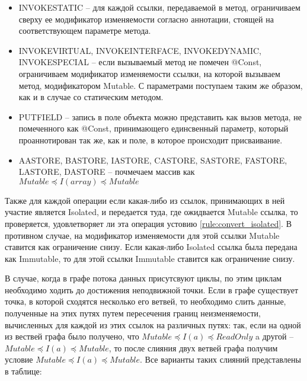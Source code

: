 \begin{itemize}
	\item INVOKESTATIC -- для каждой ссылки, передаваемой в метод, ограничиваем сверху ее модификатор изменяемости согласно аннотации, стоящей на соответствующем параметре метода.  
	\item INVOKEVIRTUAL, INVOKEINTERFACE, INVOKEDYNAMIC, INVOKESPECIAL -- если вызываемый метод не помечен @Const, ограничиваем модификатор изменяемости ссылки, на которой вызываем метод, модификатором Mutable. С параметрами поступаем таким же образом, как и в случае со статическим методом. 
	\item PUTFIELD -- запись в поле объекта можно представить как вызов метода, не помеченного как @Const, принимающего единсвенный параметр, который проаннотирован так же, как и поле, в которое происходит присваивание.
	\item AASTORE, BASTORE, IASTORE, CASTORE, SASTORE, FASTORE, LASTORE, DASTORE -- почмечаем массив как $Mutable \preceq I(array) \preceq Mutable$
\end{itemize}

Также для каждой операции если какая-либо из ссылок, принимающих в ней участие является Isolated, и передается туда, где ожидвается Mutable ссылка, то проверяется, удовлетворяет ли эта операция устовию \ref{rule:convert_isolated}. В противном случае, на модификатор изменяемости для этой ссылки Mutable ставится как ограничение снизу. Если какая-либо Isolated ссылка была передана как Immutable, то для этой ссылки Immutable ставится как ограничение снизу.   

В случае, когда в графе потока данных присутсвуют циклы, по этим циклам необходимо ходить до достижения неподвижной точки. Если в графе существует точка, в которой сходятся несколько его ветвей, то необходимо слить данные, полученные на этих путях путем пересечения границ неизменяемости, вычисленных для каждой из этих ссылок на различных путях: так, если на одной из вествей графа было получено, что $Mutable \preceq I(a) \preceq  ReadOnly$ a другой -- $Mutable \preceq I(a) \preceq  Mutable$, то после слияния двух ветвей графа получим условие $Mutable \preceq I(a) \preceq  Mutable$. Все варианты таких слияний представлены в таблице:

